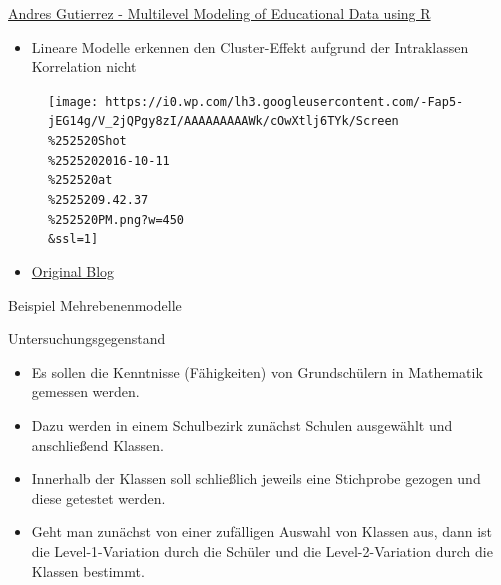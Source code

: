 \documentclass[ignorenonframetext,]{beamer}
\providecommand{\tightlist}{%
\setlength{\itemsep}{0pt}\setlength{\parskip}{0pt}}
\begin{document}
\begin{frame}{\href{https://www.r-bloggers.com/multilevel-modeling-of-educational-data-using-r-part-1/}{Andres
Gutierrez - Multilevel Modeling of Educational Data using R}}

\begin{itemize}
\tightlist
\item
  Lineare Modelle erkennen den Cluster-Effekt aufgrund der Intraklassen
  Korrelation nicht
\end{itemize}

\begin{figure}[htbp]
\centering
\texttt{[image: https://i0.wp.com/lh3.googleusercontent.com/-Fap5-jEG14g/V\_2jQPgy8zI/AAAAAAAAAWk/cOwXtlj6TYk/Screen\\\%252520Shot\\\%2525202016-10-11\\\%252520at\\\%2525209.42.37\\\%252520PM.png?w=450\\\&ssl=1]}
\caption{}
\end{figure}

\begin{itemize}
\tightlist
\item
  \href{http://hagutierrezro.blogspot.de/2016/10/multilevel-modeling-of-educational-data.html}{Original
  Blog}
\end{itemize}

\end{frame}

\begin{frame}{Beispiel Mehrebenenmodelle}

Untersuchungsgegenstand

\begin{itemize}
\item
  Es sollen die Kenntnisse (Fähigkeiten) von Grundschülern in Mathematik
  gemessen werden.
\item
  Dazu werden in einem Schulbezirk zunächst Schulen ausgewählt und
  anschließend Klassen.
\item
  Innerhalb der Klassen soll schließlich jeweils eine Stichprobe gezogen
  und diese getestet werden.
\item
  Geht man zunächst von einer zufälligen Auswahl von Klassen aus, dann
  ist die Level-1-Variation durch die Schüler und die Level-2-Variation
  durch die Klassen bestimmt.
\end{itemize}

\end{frame}
\end{document}
